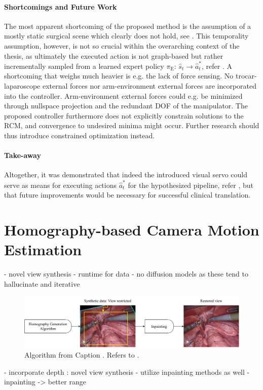 \paragraph{Shortcomings and Future Work} The most apparent shortcoming of the proposed method is the assumption of a mostly static surgical scene which clearly does not hold, see . This temporality assumption, however, is not so crucial within the overarching context of the thesis, as ultimately the executed action is not graph-based but rather incrementally sampled from a learned expert policy $\pi_\text{E}:\, \hat{s}_t \rightarrow \hat{a}^*_t$, refer . A shortcoming that weighs much heavier is e.g. the lack of force sensing. No trocar-laparoscope external forces nor arm-environment external forces are incorporated into the controller. Arm-environment external forces could e.g. be minimized through nullspace projection and the redundant DOF of the manipulator. The proposed controller furthermore does not explicitly constrain solutions to the RCM, and convergence to undesired minima might occur. Further research should thus introduce constrained optimization instead.

\paragraph{Take-away} Altogether, it was demonstrated that indeed the introduced visual servo could serve as means for executing actions $\hat{a}^*_t$ for the hypothesized pipeline, refer , but that future improvements would be necessary for successful clinical translation.

\section{Homography-based Camera Motion Estimation}
\label{con:sec:hom_est}

- novel view synthesis
    - runtime for data
    - no diffusion models \cite{rombach2022high} as these tend to hallucinate and iterative  
\begin{figure}
    \centering
    \includegraphics[width=\textwidth]{conclusion/fig/fourier_inpainting.pdf}
    \caption{Algorithm from   Caption \cite{suvorov2021resolution}. Refers to .}
    \label{con:fig:inpainting}
\end{figure}
- incorporate depth \cite{budd2024transferring}: novel view synthesis
- utilize inpainting methods as well
- inpainting -> better range


